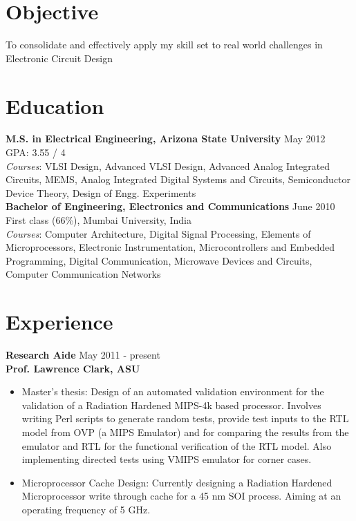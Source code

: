 \documentclass[margin]{res}
\begin{document}
\vspace*{-0.5in}


\address{ \textit{email}: ssridh14@asu.edu\\ \textit{phone}:  +1 (480) 327-7224}

\begin{resume} 

\section{Objective}
To consolidate and effectively apply my skill set to real world challenges in Electronic Circuit Design

\section{Education}
{\bf M.S. in Electrical Engineering, Arizona State University} \hfill  May 2012\\
GPA: 3.55 / 4\\
\textit{Courses}: VLSI Design, Advanced VLSI Design, Advanced Analog Integrated Circuits, MEMS, Analog Integrated Digital Systems and Circuits, Semiconductor Device Theory, Design of Engg. Experiments\\

\vspace{-0.2in}
{\bf Bachelor of Engineering, Electronics and Communications}  \hfill June 2010\\
First class (66\%), Mumbai University, India\\
\textit{Courses}: Computer Architecture, Digital Signal Processing, Elements of Microprocessors, Electronic Instrumentation, Microcontrollers and Embedded Programming, Digital Communication, Microwave Devices and Circuits, Computer Communication Networks

\section{Experience}
{\bf Research Aide} \hfill May 2011 - present\\
{\bf Prof. Lawrence Clark, ASU}
\begin{itemize}
	\item Master’s thesis: Design of an automated validation environment for the validation of a Radiation Hardened MIPS-4k based processor. Involves writing Perl scripts to generate random tests, provide test inputs to the RTL model from OVP (a MIPS Emulator) and for comparing the results from the emulator and RTL for the functional verification of the RTL model. Also implementing directed tests using VMIPS emulator for corner cases.	
	\item Microprocessor Cache Design: Currently designing a Radiation Hardened Microprocessor write through cache for a 45 nm SOI process. Aiming at an operating frequency of 5 GHz.
\end{itemize} 


\end{resume}
\end{document}

